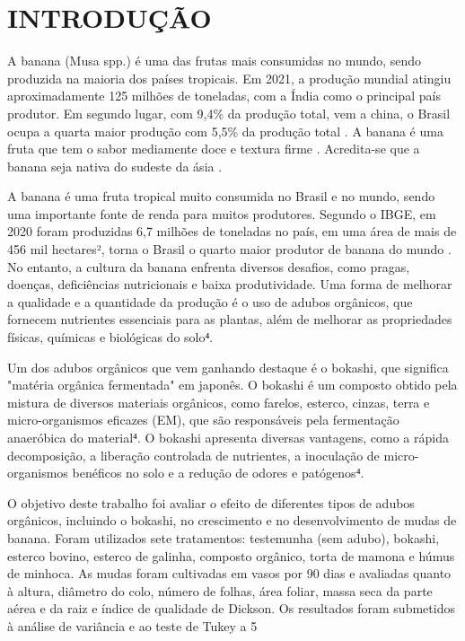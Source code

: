 \chapter{INTRODUÇÃO}

A banana (Musa spp.) é uma das frutas mais consumidas no mundo, sendo produzida na maioria dos países tropicais. Em 2021, a produção mundial atingiu aproximadamente 125 milhões de toneladas, com a Índia como o principal país produtor. Em segundo lugar, com 9,4\% da produção total, vem a china, o Brasil ocupa a quarta maior produção com 5,5\% da produção total \cite{banana}. A banana é uma fruta que tem o sabor mediamente doce e textura firme \cite{MATSUURA2004}. Acredita-se que a banana seja nativa do sudeste da ásia \cite{1956TaOo}.


A banana é uma fruta tropical muito consumida no Brasil e no mundo, sendo uma importante fonte de renda para muitos produtores. Segundo o IBGE, em 2020 foram produzidas 6,7 milhões de toneladas no país, em uma área de mais de 456 mil hectares², torna o Brasil o quarto maior produtor de banana do mundo \cite{banana}. No entanto, a cultura da banana enfrenta diversos desafios, como pragas, doenças, deficiências nutricionais e baixa produtividade. Uma forma de melhorar a qualidade e a quantidade da produção é o uso de adubos orgânicos, que fornecem nutrientes essenciais para as plantas, além de melhorar as propriedades físicas, químicas e biológicas do solo⁴.

Um dos adubos orgânicos que vem ganhando destaque é o bokashi, que significa "matéria orgânica fermentada" em japonês. O bokashi é um composto obtido pela mistura de diversos materiais orgânicos, como farelos, esterco, cinzas, terra e micro-organismos eficazes (EM), que são responsáveis pela fermentação anaeróbica do material⁴. O bokashi apresenta diversas vantagens, como a rápida decomposição, a liberação controlada de nutrientes, a inoculação de micro-organismos benéficos no solo e a redução de odores e patógenos⁴.

O objetivo deste trabalho foi avaliar o efeito de diferentes tipos de adubos orgânicos, incluindo o bokashi, no crescimento e no desenvolvimento de mudas de banana. Foram utilizados sete tratamentos: testemunha (sem adubo), bokashi, esterco bovino, esterco de galinha, composto orgânico, torta de mamona e húmus de minhoca. As mudas foram cultivadas em vasos por 90 dias e avaliadas quanto à altura, diâmetro do colo, número de folhas, área foliar, massa seca da parte aérea e da raiz e índice de qualidade de Dickson. Os resultados foram submetidos à análise de variância e ao teste de Tukey a 5%

